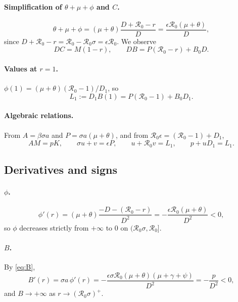 \documentclass[11pt]{article}
\theoremstyle{remark}
\newcommand{\R}{\mathcal R_0}
\begin{document}
\paragraph{Simplification of $\theta+\mu+\phi$ and $C$.}
\begin{equation}
\theta+\mu+\phi=(\mu+\theta)\frac{D+\R-r}{D}=\frac{\epsilon\R(\mu+\theta)}{D},
\end{equation}
since $D+\R-r=\R-\R\sigma=\epsilon\R$.  We observe
\begin{equation}
 DC=M(1-r),\qquad DB=P(\R-r)+B_0D .
\label{eq:C}
\end{equation}

\paragraph{Values at $r=1$.} $\phi(1)=(\mu+\theta)(\R-1)/D_1$, so
\begin{equation}
L_1:=D_1B(1)=P(\R-1)+B_0D_1 .
\label{eq:L1}
\end{equation}

\paragraph{Algebraic relations.} From $A=\beta\sigma a$ and $P=\sigma a(\mu+\theta)$, and from $\R\epsilon=(\R-1)+D_1$,
\begin{equation}
AM=pK,\qquad \sigma u+v=\epsilon P,\qquad u+\R v=L_1,\qquad p+uD_1=L_1 .
\label{eq:rel}
\end{equation}

\subsection{Derivatives and signs}

\paragraph{$\phi$.}
\[
\phi'(r)=(\mu+\theta)\frac{-D-(\R-r)}{D^2}=-\frac{\epsilon\R(\mu+\theta)}{D^2}<0 ,
\]
so $\phi$ decreases strictly from $+\infty$ to $0$ on $(\R\sigma,\R]$.

\paragraph{$B$.} By \eqref{eq:B},
\begin{equation}
B'(r)=\sigma a\,\phi'(r)=-\frac{\epsilon\sigma\R(\mu+\theta)(\mu+\gamma+\psi)}{D^2}=-\frac{p}{D^2}<0 ,
\label{eq:dB}
\end{equation}
and $B\to+\infty$ as $r\to(\R\sigma)^+$.
\end{document}
